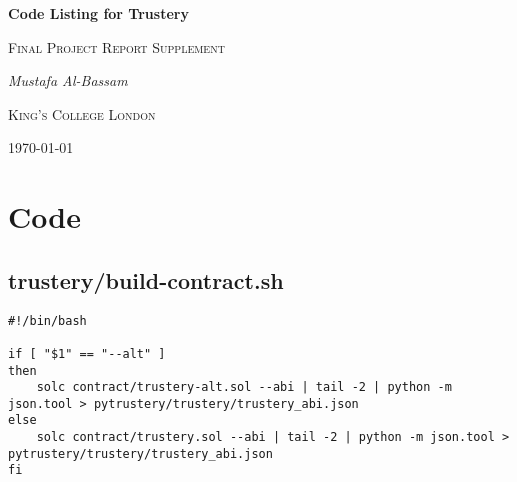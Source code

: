 \documentclass[12pt]{report}
\begin{document}
	\begin{titlepage}
		\centering
		{\huge\bfseries Code Listing for Trustery\par}
		\vspace{1cm}
		{\Large\scshape Final Project Report Supplement\par}
		\vspace{1.5cm}
		{\Large\itshape Mustafa Al-Bassam\par}
		\vfill
		{\LARGE\scshape King's College London\par}
		\vfill
		{\large \today\par}
	\end{titlepage}
	
	\tableofcontents
	
	\appendix
	\chapter{Code}
	\section{trustery/build-contract.sh}
	\begin{lstlisting}
#!/bin/bash

if [ "$1" == "--alt" ]
then
    solc contract/trustery-alt.sol --abi | tail -2 | python -m json.tool > pytrustery/trustery/trustery_abi.json
else
    solc contract/trustery.sol --abi | tail -2 | python -m json.tool > pytrustery/trustery/trustery_abi.json
fi
	\end{lstlisting}
	
\end{document}
